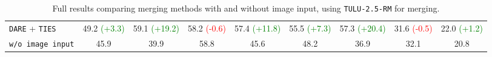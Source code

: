 \begin{table*}[hbtp]
{\begin{tabular}{l c c c c c c c c}
            \midrule
            \texttt{DARE} + \texttt{TIES}      & 49.2 \textcolor{Green}{(+3.3)} & 59.1 \textcolor{Green}{(+19.2)} & 58.2 \textcolor{Red}{(-0.6)} & 57.4 \textcolor{Green}{(+11.8)} & 55.5 \textcolor{Green}{(+7.3)} & 57.3 \textcolor{Green}{(+20.4)} & 31.6 \textcolor{Red}{(-0.5)} & 22.0 \textcolor{Green}{(+1.2)} \\
            \texttt{w/o image input}           & 45.9 & 39.9 & 58.8 & 45.6 & 48.2 & 36.9 & 32.1 & 20.8 \\
            \bottomrule
        \end{tabular}
    }
    \caption{Full results comparing merging methods with and without image input, using \texttt{TULU-2.5-RM} for merging.}
    \label{tab:cmp_image_full_tulu25}
\end{table*}